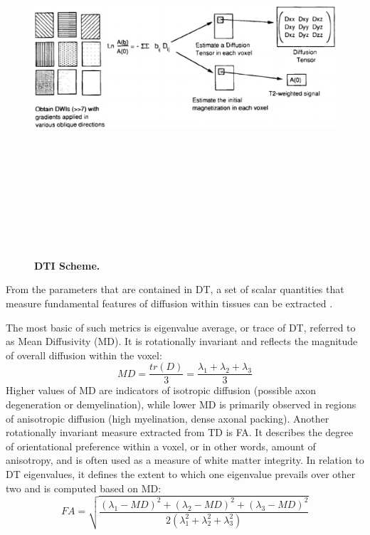 \documentclass[thesis.tex]{subfiles}
\begin{document}
\begin{figure}
\centering
\includegraphics[width=14cm,height=14cm,keepaspectratio]{thesis_radomskyi/images/dti-scheme-cite-Basser1995InferringMF.png}
\caption{\textbf{DTI Scheme.}}
\label{fig:dti-scheme}
\end{figure}

From the parameters that are contained in DT, a set of scalar quantities that measure fundamental features of diffusion within tissues can be extracted  \cite{Basser1995InferringMF, Basser1996FA}.

The most basic of such metrics is eigenvalue average, or trace of DT, referred to as Mean Diffusivity (MD). It is rotationally invariant and reflects the magnitude of overall diffusion within the voxel:
\[ MD = \frac{tr(D)}{3} = \frac{\lambda_1 + \lambda_2 + \lambda_3}{3} \]
Higher values of MD are indicators of isotropic diffusion (possible axon degeneration or demyelination), while lower MD is primarily observed in regions of anisotropic diffusion (high myelination, dense axonal packing). Another rotationally invariant measure extracted from TD is FA. It describes the degree of orientational preference within a voxel, or in other words, amount of anisotropy, and is often used as a measure of white matter integrity. In relation to DT eigenvalues, it defines the extent to which one eigenvalue prevails over other two and is computed based on MD:
\[ FA = \sqrt{\frac{(\lambda_1 - MD)^2 + (\lambda_2 - MD)^2 + (\lambda_3 - MD)^2}{2(\lambda_{1}^2 + \lambda_{2}^2 + \lambda_{3}^2)}} \]
\end{document}
